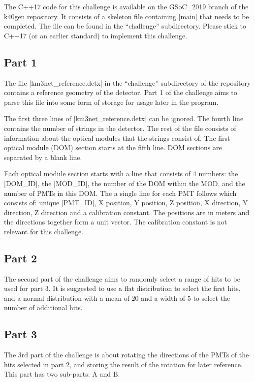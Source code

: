 \documentclass{article}
\begin{document}
The C++17 code for this challenge is available on the GSoC\_2019
branch of the k40gen repository. It consists of a skeleton file
containing |main| that needs to be completed. The file can be found in
the ``challenge'' subdirectory. Please stick to C++17 (or an earlier
standard) to implement this challenge.

\subsection{Part 1}

The file |km3net_reference.detx| in the ``challenge'' subdirectory of
the repository contains a reference geometry of the detector. Part 1
of the challenge aims to parse this file into some form of storage for
usage later in the program.

The first three lines of |km3net_reference.detx| can be ignored. The
fourth line contains the number of strings in the detector. The rest
of the file consists of information about the optical modules that the
strings consist of. The first optical module (DOM) section starts at
the fifth line. DOM sections are separated by a blank line.

Each optical module section starts with a line that consists of 4
numbers: the |DOM_ID|, the |MOD_ID|, the number of the DOM within the
MOD, and the number of PMTs in this DOM. The a single line for each
PMT follows which consists of: unique |PMT_ID|, X position, Y
position, Z position, X direction, Y direction, Z direction and a
calibration constant. The positions are in meters and the directions
together form a unit vector. The calibration constant is not relevant
for this challenge.

\subsection{Part 2}

The second part of the challenge aims to randomly select a range of
hits to be used for part 3. It is suggested to use a flat distribution
to select the first hits, and a normal distribution with a mean of 20
and a width of 5 to select the number of additional hits.

\subsection{Part 3}

The 3rd part of the challenge is about rotating the directions of the
PMTs of the hits selected in part 2, and storing the result of the
rotation for later reference. This part has two sub-parts: A and B.
\end{document}
